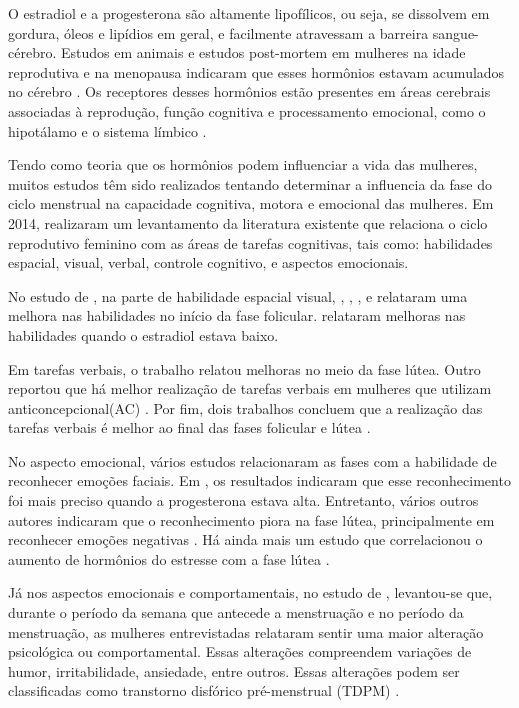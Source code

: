 O estradiol e a progesterona são altamente lipofílicos, ou seja, se dissolvem em gordura, óleos e 
lipídios em geral, e facilmente atravessam a barreira sangue-cérebro. Estudos em animais e estudos 
post-mortem em mulheres na idade reprodutiva e na menopausa indicaram que esses hormônios estavam 
acumulados no cérebro \cite{bixo1997}. Os receptores desses hormônios estão presentes em áreas 
cerebrais associadas à reprodução, função cognitiva e processamento emocional, como o hipotálamo e o 
sistema límbico \cite{gruber2002, brinton2008}.


Tendo como teoria que os hormônios podem influenciar a vida das mulheres, muitos estudos têm sido 
realizados tentando determinar a influencia da fase do ciclo menstrual na capacidade cognitiva, 
motora e emocional das mulheres. Em 2014,  realizaram um levantamento da 
literatura existente que relaciona o ciclo reprodutivo feminino com as áreas de tarefas cognitivas, 
tais como: habilidades espacial, visual, verbal, controle cognitivo, e aspectos emocionais.


No estudo de , na parte de habilidade espacial visual, 
, , ,  e  
relataram uma melhora 
nas habilidades no início da fase folicular.  relataram melhoras nas habilidades quando o 
estradiol estava baixo. 


Em tarefas verbais, o trabalho \cite{maki2002} relatou melhoras no meio da fase lútea. Outro 
reportou que há melhor realização de tarefas verbais em mulheres que utilizam anticoncepcional(AC) 
\cite{mordecai2008}. Por fim, dois trabalhos concluem que a realização das tarefas verbais é melhor 
ao final das fases folicular e lútea \cite{Rosenberg2002, solis2004}.


No aspecto emocional, vários estudos relacionaram as fases com a habilidade de reconhecer emoções 
faciais. Em , os resultados indicaram que esse reconhecimento foi mais 
preciso quando a progesterona estava alta. Entretanto, vários outros autores indicaram que o 
reconhecimento piora na fase lútea, principalmente em reconhecer emoções negativas \cite{gasbarri2008}.
Há ainda mais um estudo que correlacionou o aumento de hormônios do estresse com a fase lútea \cite{kirschbaum1999}.



Já nos aspectos emocionais e comportamentais, no estudo de , levantou-se que, 
durante o período da semana que antecede a menstruação e no período da menstruação, as mulheres 
entrevistadas relataram sentir uma maior alteração psicológica ou comportamental. Essas alterações 
compreendem variações de humor, irritabilidade, ansiedade, entre outros. Essas alterações podem ser 
classificadas como transtorno disfórico pré-menstrual (TDPM) \cite{ACOG2000}.

